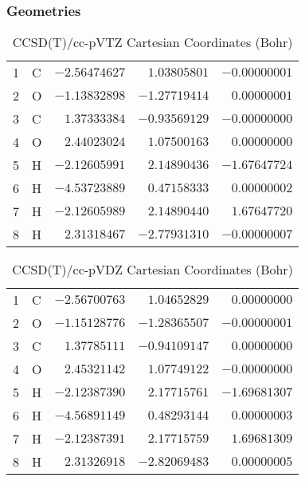 \documentclass[10pt,oneside]{article}
\begin{document}
\subsubsection*{Geometries}
\begin{table}[h!]
\centering
\caption{CCSD(T)/cc-pVTZ Cartesian Coordinates (Bohr)}
\begin{tabular}{llrrr}
1  & C  & $-2.56474627$ & $ 1.03805801$ & $-0.00000001$ \\
2  & O  & $-1.13832898$ & $-1.27719414$ & $ 0.00000001$ \\
3  & C  & $ 1.37333384$ & $-0.93569129$ & $-0.00000000$ \\
4  & O  & $ 2.44023024$ & $ 1.07500163$ & $ 0.00000000$ \\
5  & H  & $-2.12605991$ & $ 2.14890436$ & $-1.67647724$ \\
6  & H  & $-4.53723889$ & $ 0.47158333$ & $ 0.00000002$ \\
7  & H  & $-2.12605989$ & $ 2.14890440$ & $ 1.67647720$ \\
8  & H  & $ 2.31318467$ & $-2.77931310$ & $-0.00000007$ \\
\end{tabular}
\end{table}

\begin{table}[h!]
\centering
\caption{CCSD(T)/cc-pVDZ Cartesian Coordinates (Bohr)}
\begin{tabular}{llrrr}
1  & C  & $-2.56700763$ & $ 1.04652829$ & $ 0.00000000$ \\
2  & O  & $-1.15128776$ & $-1.28365507$ & $-0.00000001$ \\
3  & C  & $ 1.37785111$ & $-0.94109147$ & $ 0.00000000$ \\
4  & O  & $ 2.45321142$ & $ 1.07749122$ & $-0.00000000$ \\
5  & H  & $-2.12387390$ & $ 2.17715761$ & $-1.69681307$ \\
6  & H  & $-4.56891149$ & $ 0.48293144$ & $ 0.00000003$ \\
7  & H  & $-2.12387391$ & $ 2.17715759$ & $ 1.69681309$ \\
8  & H  & $ 2.31326918$ & $-2.82069483$ & $ 0.00000005$ \\
\end{tabular}
\end{table}
\end{document}
